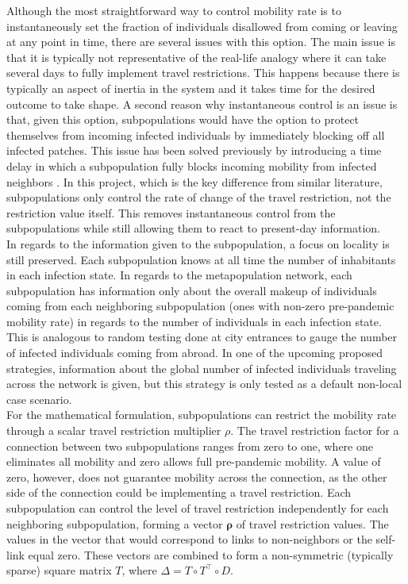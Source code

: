 Although the most straightforward way to control mobility rate is to instantaneously set the fraction of individuals disallowed from coming or leaving at any point in time, there are several issues with this option. The main issue is that it is typically not representative of the real-life analogy where it can take several days to fully implement travel restrictions. This happens because there is typically an aspect of inertia in the system and it takes time for the desired outcome to take shape. A second reason why instantaneous control is an issue is that, given this option, subpopulations would have the option to protect themselves from incoming infected individuals by immediately blocking off all infected patches. This issue has been solved previously by introducing a time delay in which a subpopulation fully blocks incoming mobility from infected neighbors \cite{feng2020infectious}. In this project, which is the key difference from similar literature, subpopulations only control the rate of change of the travel restriction, not the restriction value itself. This removes instantaneous control from the subpopulations while still allowing them to react to present-day information.\\

In regards to the information given to the subpopulation, a focus on locality is still preserved. Each subpopulation knows at all time the number of inhabitants in each infection state. In regards to the metapopulation network, each subpopulation has information only about the overall makeup of individuals coming from each neighboring subpopulation (ones with non-zero pre-pandemic mobility rate) in regards to the number of individuals in each infection state. This is analogous to random testing done at city entrances to gauge the number of infected individuals coming from abroad. In one of the upcoming proposed strategies, information about the global number of infected individuals traveling across the network is given, but this strategy is only tested as a default non-local case scenario.\\

For the mathematical formulation, subpopulations can restrict the mobility rate through a scalar travel restriction multiplier $\rho$. The travel restriction factor for a connection between two subpopulations ranges from zero to one, where one eliminates all mobility and zero allows full pre-pandemic mobility. A value of zero, however, does not guarantee mobility across the connection, as the other side of the connection could be implementing a travel restriction. Each subpopulation can control the level of travel restriction independently for each neighboring subpopulation, forming a vector $\mathbf{\rho}$ of travel restriction values. The values in the vector that would correspond to links to non-neighbors or the self-link equal zero. These vectors are combined to form a non-symmetric (typically sparse) square matrix $T$, where $\Delta = T \circ T^\top \circ D$.\\


